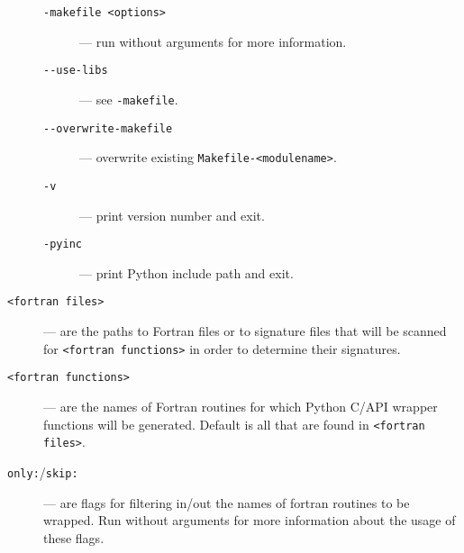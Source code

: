 \begin{description}
\begin{description}
  \item[\texttt{-makefile <options>}] --- run \fpy without arguments
    for more information.
  \item[\texttt{-{}-use-libs}] --- see \texttt{-makefile}.
  \item[\texttt{-{}-overwrite-makefile}] --- overwrite existing
    \texttt{Makefile-<modulename>}.
  \item[\texttt{-v}] --- print \fpy version number and exit.
  \item[\texttt{-pyinc}] --- print Python include path and exit.
  \end{description}
\item[\texttt{<fortran files>}] --- are the paths to Fortran files or
  to signature files that will be scanned for \texttt{<fortran
    functions>} in order to determine their signatures.
\item[\texttt{<fortran functions>}] --- are the names of Fortran
  routines for which Python C/API wrapper functions will be generated.
  Default is all that are found in \texttt{<fortran files>}.
\item[\texttt{only:}/\texttt{skip:}] --- are flags for filtering
  in/out the names of fortran routines to be wrapped. Run \fpy without
  arguments for more information about the usage of these flags.
\end{description}


